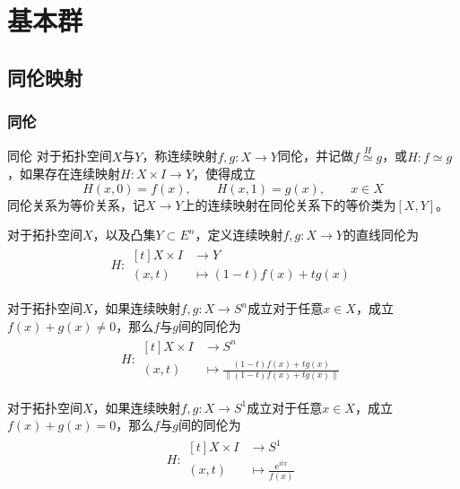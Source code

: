 \documentclass[lang = cn, scheme = chinese, thmcnt = section, usesamecnt]{elegantbook}
\newcommand{\sub}{\subset}             %
\begin{document}
\chapter{基本群}

\section{同伦映射}

\subsection{同伦}

\begin{definition}{同伦}
	对于拓扑空间$X$与$Y$，称连续映射$f,g:X\to Y$同伦，并记做$f\overset{H}{\simeq}g$，或$H:f\simeq g$，如果存在连续映射$H:X\times I \to Y$，使得成立%
	$$
	H(x,0)=f(x),\qquad
	H(x,1)=g(x),\qquad
	x\in X
	$$
	同伦关系为等价关系，记$X\to Y$上的连续映射在同伦关系下的等价类为$[X,Y]$。
\end{definition}

\begin{example}
	对于拓扑空间$X$，以及凸集$Y\sub E^n$，定义连续映射$f,g:X\to Y$的直线同伦为
	\begin{align*}
		H:\begin{aligned}[t]
			X\times I &\longrightarrow Y\\
			(x,t) &\longmapsto (1-t)f(x)+tg(x)
		\end{aligned}
	\end{align*}
\end{example}

\begin{example}
	对于拓扑空间$X$，如果连续映射$f,g:X\to S^n$成立对于任意$x\in X$，成立$f(x)+g(x)\ne0$，那么$f$与$g$间的同伦为
	\begin{align*}
		H:\begin{aligned}[t]
			X\times I &\longrightarrow S^n\\
			(x,t) &\longmapsto \frac{(1-t)f(x)+tg(x)}{\|(1-t)f(x)+tg(x)\|}
		\end{aligned}
	\end{align*}
\end{example}

\begin{example}
	对于拓扑空间$X$，如果连续映射$f,g:X\to S^1$成立对于任意$x\in X$，成立$f(x)+g(x)=0$，那么$f$与$g$间的同伦为
	\begin{align*}
		H:\begin{aligned}[t]
			X\times I &\longrightarrow S^1\\
			(x,t) &\longmapsto \frac{\mathrm{e}^{it\pi}}{f(x)}
			\end{aligned}
	\end{align*}
\end{example}
\end{document}

